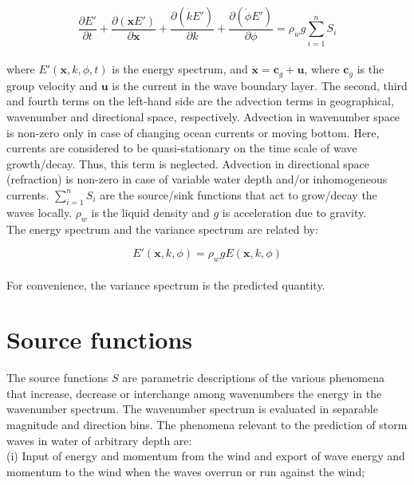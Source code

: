 \documentclass[letterpaper]{article}
\numberwithin{equation}{section}
\begin{document}
\begin{equation}
\dfrac{\partial E'}{\partial t} + 
\dfrac{\partial (\dot{\textbf{x}}E')}{\partial \textbf{x}} + 
\dfrac{\partial (\dot{k}E')}{\partial k} + 
\dfrac{\partial (\dot{\phi}E')}{\partial \phi} = 
\rho_{w}g\displaystyle\sum_{i=1}^{n}S_{i} 
\label{energy_balance}
\end{equation}
\\
where $E'(\textbf{x},k,\phi,t)$ is the energy spectrum, and $\dot{\textbf{x}}=\textbf{c}_{g}+\textbf{u}$, 
where $\textbf{c}_{g}$ is the group velocity and $\textbf{u}$ is the current in the wave boundary layer. 
The second, third and fourth terms on the left-hand side are the advection terms
in geographical, wavenumber and directional space, respectively.
Advection in wavenumber space is non-zero only in case of changing ocean currents or moving bottom.
Here, currents are considered to be quasi-stationary on the time scale of wave growth/decay.
Thus, this term is neglected.
Advection in directional space (refraction) is non-zero in case of variable water depth 
and/or inhomogeneous currents. $\displaystyle\sum_{i=1}^{n}S_{i}$ are the source/sink functions 
that act to grow/decay the waves locally.
$\rho_{w}$ is the liquid density and $g$ is acceleration due to gravity.\\

The energy spectrum and the variance spectrum are related by:

\begin{equation}
E'(\textbf{x},k,\phi)=\rho_{w}gE(\textbf{x},k,\phi)
\end{equation}
\\
For convenience, the variance spectrum is the predicted quantity.

\newpage
\section{Source functions}

The source functions $S$ are parametric descriptions of the various phenomena that increase, decrease or interchange among wavenumbers the energy in the wavenumber spectrum. 
The wavenumber spectrum is evaluated in separable magnitude and direction bins. 
The phenomena relevant to the prediction of storm waves in water of arbitrary depth are: \\

(i) Input of energy and momentum from the wind and export of wave energy and momentum to the wind when the waves overrun or run against the wind; \\
\end{document}
